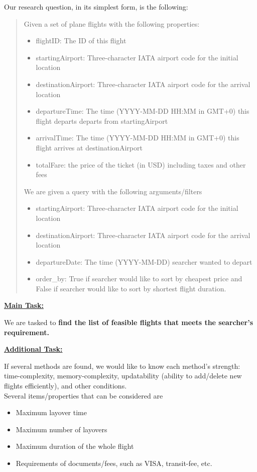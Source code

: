 \documentclass[11pt]{article}
\begin{document}
Our research question, in its simplest form, is the following:
\begin{quote}
Given a set of plane flights with the following properties:
\begin{itemize}
    \item flightID: The ID of this flight
    \item startingAirport: Three-character IATA airport code for the initial location
    \item destinationAirport: Three-character IATA airport code for the arrival location
    \item departureTime: The time (YYYY-MM-DD HH:MM in GMT+0) this flight departs departs from startingAirport
    \item arrivalTime: The time (YYYY-MM-DD HH:MM in GMT+0) this flight arrives at destinationAirport
    \item totalFare: the price of the ticket (in USD) including taxes and other fees
\end{itemize}

We are given a query with the following arguments/filters
\begin{itemize}
    \item startingAirport: Three-character IATA airport code for the initial location
    \item destinationAirport: Three-character IATA airport code for the arrival location
    \item departureDate: The time (YYYY-MM-DD) searcher wanted to depart
    \item order\_by: True if searcher would like to sort by cheapest price and False if searcher would like to sort by shortest flight duration.
\end{itemize}
\end{quote}

\underline{\textbf{Main Task:}}

We are tasked to  \textbf{find the list of feasible flights that meets the searcher's requirement.} 

\underline{\textbf{Additional Task:}}

If several methods are found, we would like to know each method's strength: time-complexity, memory-complexity, updatability (ability to add/delete new flights efficiently), and other conditions. 
\\

Several items/properties that can be considered are
\begin{itemize}
    \item Maximum layover time
    \item Maximum number of layovers
    \item Maximum duration of the whole flight
    \item Requirements of documents/fees, such as VISA, transit-fee, etc.
\end{itemize}
\end{document}
